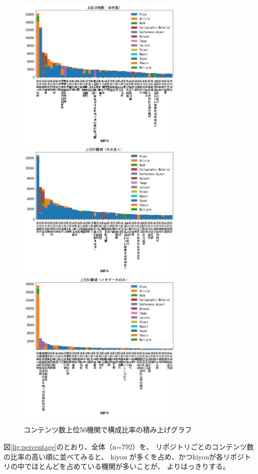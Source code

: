 \documentclass[submit,noauthor]{ono}
\begin{document}
\begin{figure}[h]
	\includegraphics[width=8cm]{./picture/stack_all.png}
	\includegraphics[width=8cm]{./picture/stack_honbun.png}
	\includegraphics[width=8cm]{./picture/stack_sabun.png}
	\caption{コンテンツ数上位50機関で構成比率の積み上げグラフ}
	\label{fig:stack1}
\end{figure}

図\ref{fig:percentage}のとおり、全体（n=792）を、
リポジトリごとのコンテンツ数の比率の高い順に並べてみると、
kiyou が多くを占め、かつkiyouが各リポジトリの中でほとんどを占めている機関が多いことが、
よりはっきりする。
\end{document}
